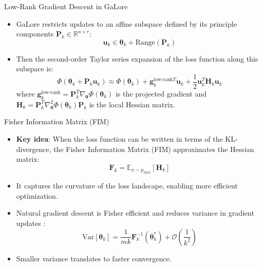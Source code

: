 \documentclass{beamer}
\begin{document}
\begin{frame}{Low-Rank Gradient Descent in GaLore}
    \begin{itemize}
        \item GaLore restricts updates to an affine subspace defined by its principle components \(\mathbf{P}_k \in \mathbb{R}^{n \times r}\):
        \[
            \mathbf{u}_k \in \mathbf{\theta}_k + \text{Range}(\mathbf{P}_k)
        \]
        \item Then the second-order Taylor series expansion of the loss function along this subspace is:
        \[
            \Phi(\mathbf{\theta}_k + \mathbf{P}_k \mathbf{u}_k) \approx \Phi(\mathbf{\theta}_k) + \mathbf{g}_{k}^{\text{low-rank} T} \mathbf{u}_k + \frac{1}{2} \mathbf{u}_k^T \mathbf{H}_k \mathbf{u}_k
        \]
        where \(\mathbf{g}_{k}^{\text{low-rank}} = \mathbf{P}_k^T \nabla_{\mathbf{\theta}} \Phi(\mathbf{\theta}_k)\) is the projected gradient and \(\mathbf{H}_k = \mathbf{P}_k^T \nabla^2_{\mathbf{\theta}} \Phi(\mathbf{\theta}_k) \mathbf{P}_k\) is the local Hessian matrix.
    \end{itemize}
\end{frame}

\begin{frame}{Fisher Information Matrix (FIM)}
    \begin{itemize}
        \item \textbf{Key idea}: When the loss function can be written in terms of the KL-divergence, the Fisher Information Matrix (FIM) approximates the Hessian matrix:
        \[
            \mathbf{F}_k = \mathbb{E}_{x \sim p_{\text{data}}} [ \mathbf{H}_k ]
        \]
        \item It captures the curvature of the loss landscape, enabling more efficient optimization.
        \item Natural gradient descent is Fisher efficient and reduces variance in gradient updates \citep{amariNaturalGradientWorks1998}:
        \[
            \text{Var}[\mathbf{\theta}_k] = \frac{1}{mk} \mathbf{F}_k^{-1}(\mathbf{\theta}_k^*) + \mathcal{O}\left(\frac{1}{k^2}\right)
        \]
        \item Smaller variance translates to faster convergence.
    \end{itemize}
\end{frame}
\end{document}
